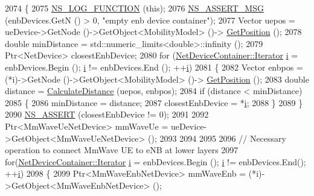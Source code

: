 \begin{DoxyCode}
2074 \{
2075         \hyperlink{log-macros-disabled_8h_a90b90d5bad1f39cb1b64923ea94c0761}{NS\_LOG\_FUNCTION} (\textcolor{keyword}{this});
2076         \hyperlink{assert_8h_aff5ece9066c74e681e74999856f08539}{NS\_ASSERT\_MSG} (enbDevices.GetN () > 0, \textcolor{stringliteral}{"empty enb device container"});
2077         Vector uepos = ueDevice->GetNode ()->GetObject<MobilityModel> ()->
      \hyperlink{lena-cqi-threshold_8cc_acebf763e1a0478cec225f9547941ae54}{GetPosition} ();
2078         \textcolor{keywordtype}{double} minDistance = std::numeric\_limits<double>::infinity ();
2079         Ptr<NetDevice> closestEnbDevice;
2080         \textcolor{keywordflow}{for} (\hyperlink{classns3_1_1NetDeviceContainer_a45709bb572f975569ed985fa89b132f8}{NetDeviceContainer::Iterator} \hyperlink{bernuolliDistribution_8m_a6f6ccfcf58b31cb6412107d9d5281426}{i} = enbDevices.Begin (); 
      \hyperlink{bernuolliDistribution_8m_a6f6ccfcf58b31cb6412107d9d5281426}{i} != enbDevices.End (); ++\hyperlink{bernuolliDistribution_8m_a6f6ccfcf58b31cb6412107d9d5281426}{i})
2081         \{
2082             Vector enbpos = (*i)->GetNode ()->GetObject<MobilityModel> ()->
      \hyperlink{lena-cqi-threshold_8cc_acebf763e1a0478cec225f9547941ae54}{GetPosition} ();
2083             \textcolor{keywordtype}{double} distance = \hyperlink{namespacens3_aaae60adf695e280c4882ced6041d1628}{CalculateDistance} (uepos, enbpos);
2084             \textcolor{keywordflow}{if} (distance < minDistance)
2085             \{
2086                 minDistance = distance;
2087                 closestEnbDevice = *\hyperlink{bernuolliDistribution_8m_a6f6ccfcf58b31cb6412107d9d5281426}{i};
2088             \}
2089         \}
2090         \hyperlink{assert_8h_a6dccdb0de9b252f60088ce281c49d052}{NS\_ASSERT} (closestEnbDevice != 0);
2091 
2092         Ptr<MmWaveUeNetDevice> mmWaveUe = ueDevice->GetObject<MmWaveUeNetDevice> ();
2093 
2094 
2095 
2096         \textcolor{comment}{// Necessary operation to connect MmWave UE to eNB at lower layers}
2097         \textcolor{keywordflow}{for}(\hyperlink{classns3_1_1NetDeviceContainer_a45709bb572f975569ed985fa89b132f8}{NetDeviceContainer::Iterator} \hyperlink{bernuolliDistribution_8m_a6f6ccfcf58b31cb6412107d9d5281426}{i} = enbDevices.Begin (); 
      \hyperlink{bernuolliDistribution_8m_a6f6ccfcf58b31cb6412107d9d5281426}{i} != enbDevices.End(); ++\hyperlink{bernuolliDistribution_8m_a6f6ccfcf58b31cb6412107d9d5281426}{i})
2098         \{
2099                 Ptr<MmWaveEnbNetDevice> mmWaveEnb = (*i)->GetObject<MmWaveEnbNetDevice> (); 

\end{DoxyCode}
